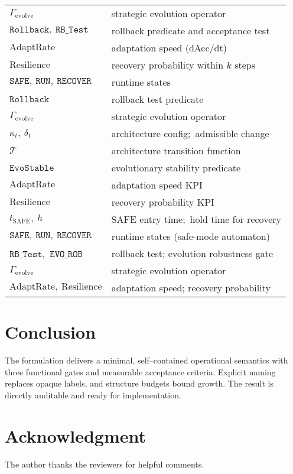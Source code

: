 \documentclass[conference]{IEEEtran}
\begin{document}
\begin{table}[!hbt]
\begin{tabular}{p{.36\linewidth}p{.6\linewidth}}
$\Gamma_{\mathrm{evolve}}$ & strategic evolution operator \\
$\mathtt{Rollback},\ \mathtt{RB\_Test}$ & rollback predicate and acceptance test \\
$\mathrm{AdaptRate}$ & adaptation speed (dAcc/dt) \\
$\mathrm{Resilience}$ & recovery probability within $k$ steps \\
$\mathtt{SAFE},\ \mathtt{RUN},\ \mathtt{RECOVER}$ & runtime states \\
$\mathtt{Rollback}$ & rollback test predicate \\
$\Gamma_{\mathrm{evolve}}$ & strategic evolution operator \\
$\kappa_t,\ \delta_t$ & architecture config;\ admissible change \\
$\mathcal{T}$ & architecture transition function \\
$\mathtt{EvoStable}$ & evolutionary stability predicate \\
$\mathrm{AdaptRate}$ & adaptation speed KPI \\
$\mathrm{Resilience}$ & recovery probability KPI \\
$t_{\mathrm{SAFE}},\ h$ & SAFE entry time;\ hold time for recovery \\
$\mathtt{SAFE},\ \mathtt{RUN},\ \mathtt{RECOVER}$ & runtime states (safe-mode automaton) \\
$\mathtt{RB\_Test}$,\ $\mathtt{EVO\_ROB}$ & rollback test; evolution robustness gate \\
$\Gamma_{\mathrm{evolve}}$ & strategic evolution operator \\
$\mathrm{AdaptRate},\ \mathrm{Resilience}$ & adaptation speed; recovery probability \\
\hline
\end{tabular}
\end{table}

\section{Conclusion}
The formulation delivers a minimal, self--contained operational semantics with three functional gates and measurable acceptance criteria. Explicit naming replaces opaque labels, and structure budgets bound growth. The result is directly auditable and ready for implementation.

\section*{Acknowledgment}
The author thanks the reviewers for helpful comments.
\end{document}
